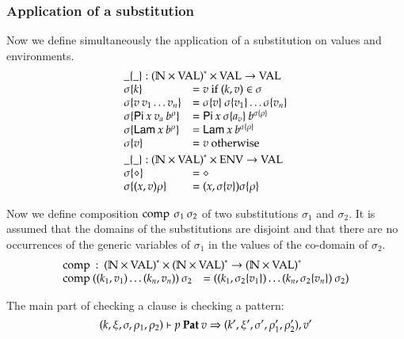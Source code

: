 \subsubsection{Application of a substitution}
Now we define simultaneously the application of a substitution on values and environments.
\[
\begin{array}{ll}
\multicolumn{2}{l}{\subst{\_}{\_} : \ves{(\cN \times \Val)} \times \Val \ra \Val} \\
\subst{\sigma}{k} & = v \mbox{ if } (k,v) \in \sigma \\
\subst{\sigma}{v \: v_1 \ldots v_n} & = \subst{\sigma}{v} \: \subst{\sigma}{v_1} \ldots \subst{\sigma}{v_n}\\
\subst{\sigma}{\vpi \: x \: v_a \: \cl{b}{\rho}} & = \vpi \: x \: \subst{\sigma}{a_v} \: \cl{b}{\subst{\sigma}{\rho}} \\
\subst{\sigma}{\vlam \: x \: \cl{b}{\rho}} & = \vlam \: x \: \cl{b}{\subst{\sigma}{\rho}} \\
\subst{\sigma}{v} & = v \mbox{ otherwise }
\vs\\
\multicolumn{2}{l}{\substEnv{\_}{\_} : \ves{(\cN \times \Val)} \times \Env \ra \Val} \\
\substEnv{\sigma}{\diamond} & = \diamond \\
\substEnv{\sigma}{(x,v)\rho} & = (x,\subst{\sigma}{v}) \substEnv{\sigma}{\rho} \\
\end{array}
\]

Now we define composition $\operatorname{comp}\:\sigma_1\:\sigma_2$ of two substitutions $\sigma_1$ and $\sigma_2$.
It is assumed that the domains of the substitutions are disjoint and that there are no occurrences of the generic variables of $\sigma_1$ in the values of the co-domain of $\sigma_2$.  
\[
\begin{array}{ll}
\multicolumn{2}{l}{\compS : \ves{(\cN \times \Val)} \times \ves{(\cN \times \Val)} \ra \ves{(\cN \times \Val)}} \\
\compS{((k_1,v_1)\ldots(k_n,v_n))}{\sigma_2} & = ((k_1,\subst{\sigma_2}{v_1})\ldots(k_n,\subst{\sigma_2}{v_n})\: \sigma_2) 
\end{array}
\]

The main part of checking a clause is checking a pattern:
\[
(k,\xi,\sigma,\rho_1,\rho_2)\vdash p\:\mathbf{Pat}\:v\Rightarrow (k',\xi',\sigma',\rho'_1,\rho'_2),v'
\]

